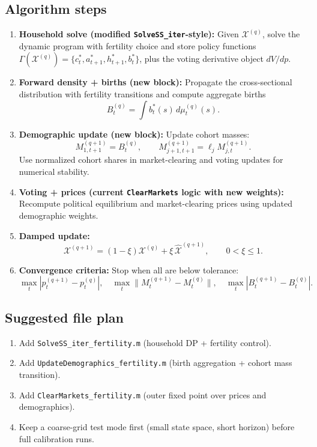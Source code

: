\documentclass[11pt]{article}
\begin{document}
\subsection*{Algorithm steps}
\begin{enumerate}
\item \textbf{Household solve (modified \texttt{SolveSS\_iter}-style):}
Given \(\mathcal X^{(q)}\), solve the dynamic program with fertility choice and store policy functions
\(\Gamma(\mathcal X^{(q)})=\{c_t^*,a_{t+1}^*,h_{t+1}^*,b_t^*\}\), plus the voting derivative object \(dV/dp\).

\item \textbf{Forward density + births (new block):}
Propagate the cross-sectional distribution with fertility transitions and compute aggregate births
\[
B_t^{(q)}=\int b_t^*(s)\,d\mu_t^{(q)}(s).
\]

\item \textbf{Demographic update (new block):}
Update cohort masses:
\[
M_{1,t+1}^{(q+1)}=B_t^{(q)},\qquad
M_{j+1,t+1}^{(q+1)}=\ell_j M_{j,t}^{(q+1)}.
\]
Use normalized cohort shares in market-clearing and voting updates for numerical stability.

\item \textbf{Voting + prices (current \texttt{ClearMarkets} logic with new weights):}
Recompute political equilibrium and market-clearing prices using updated demographic weights.

\item \textbf{Damped update:}
\[
\mathcal X^{(q+1)}=(1-\xi)\mathcal X^{(q)}+\xi\,\widehat{\mathcal X}^{(q+1)},\qquad 0<\xi\le1.
\]

\item \textbf{Convergence criteria:}
Stop when all are below tolerance:
\[
\max_t|p_t^{(q+1)}-p_t^{(q)}|,\quad
\max_t\|M_t^{(q+1)}-M_t^{(q)}\|,\quad
\max_t|B_t^{(q+1)}-B_t^{(q)}|.
\]
\end{enumerate}

\subsection*{Suggested file plan}
\begin{enumerate}
\item Add \texttt{SolveSS\_iter\_fertility.m} (household DP + fertility control).
\item Add \texttt{UpdateDemographics\_fertility.m} (birth aggregation + cohort mass transition).
\item Add \texttt{ClearMarkets\_fertility.m} (outer fixed point over prices and demographics).
\item Keep a coarse-grid test mode first (small state space, short horizon) before full calibration runs.
\end{enumerate}
\end{document}
